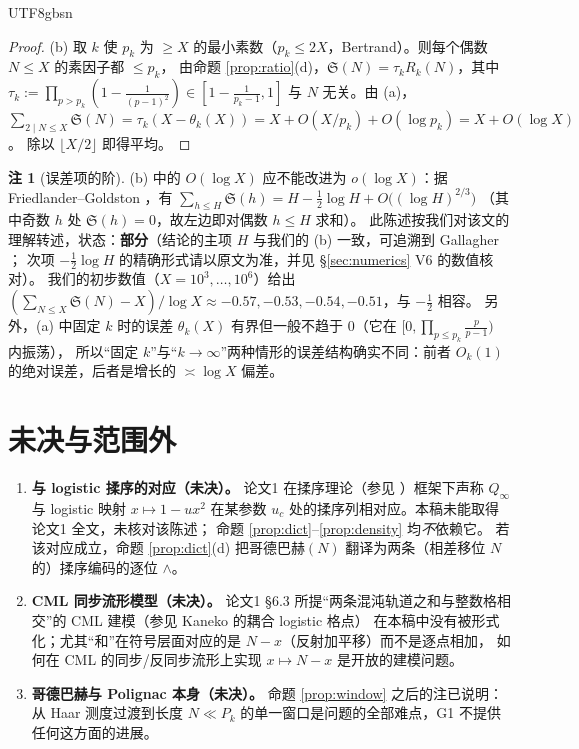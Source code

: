 \documentclass[11pt,a4paper]{article}
\newcommand{\Sing}{\mathfrak S}
\theoremstyle{plain}
\theoremstyle{definition}
\newtheorem{rem}[prop]{注}
\begin{document}
\begin{CJK}{UTF8}{gbsn}
\begin{proof}
(b) 取 $k$ 使 $p_k$ 为 $\ge X$ 的最小素数（$p_k\le2X$，Bertrand）。则每个偶数 $N\le X$ 的素因子都 $\le p_k$，
由命题 \ref{prop:ratio}(d)，$\Sing(N)=\tau_k R_k(N)$，其中 $\tau_k:=\prod_{p>p_k}(1-\frac1{(p-1)^2})\in[1-\frac1{p_k-1},1]$
与 $N$ 无关。由 (a)，
$\sum_{2\mid N\le X}\Sing(N)=\tau_k(X-\theta_k(X))=X+O(X/p_k)+O(\log p_k)=X+O(\log X)$。
除以 $\lfloor X/2\rfloor$ 即得平均。
\end{proof}

\begin{rem}[误差项的阶]\label{rem:FG}
(b) 中的 $O(\log X)$ 应不能改进为 $o(\log X)$：据 Friedlander--Goldston \cite{FG95}，有
$\sum_{h\le H}\Sing(h)=H-\tfrac12\log H+O\bigl((\log H)^{2/3}\bigr)$
（其中奇数 $h$ 处 $\Sing(h)=0$，故左边即对偶数 $h\le H$ 求和）。
此陈述按我们对该文的理解转述，状态：\textbf{部分}（结论的主项 $H$ 与我们的 (b) 一致，可追溯到 Gallagher \cite{Gal76}；
次项 $-\frac12\log H$ 的精确形式请以原文为准，并见 \S\ref{sec:numerics} V6 的数值核对）。
我们的初步数值（$X=10^3,\dots,10^6$）给出 $(\sum_{N\le X}\Sing(N)-X)/\log X\approx-0.57,-0.53,-0.54,-0.51$，与 $-\frac12$ 相容。
另外，(a) 中固定 $k$ 时的误差 $\theta_k(X)$ 有界但一般不趋于 $0$（它在 $[0,\prod_{p\le p_k}\frac p{p-1})$ 内振荡），
所以“固定 $k$”与“$k\to\infty$”两种情形的误差结构确实不同：前者 $O_k(1)$ 的绝对误差，后者是增长的 $\asymp\log X$ 偏差。
\end{rem}

\section{未决与范围外}\label{sec:open}

\begin{enumerate}[leftmargin=*]
\item \textbf{与 logistic 揉序的对应（未决）。} 论文1 \cite{Wang26} 在揉序理论（参见 \cite{MSS73}）框架下声称 $Q_\infty$ 与 logistic 映射
$x\mapsto1-ux^2$ 在某参数 $u_c$ 处的揉序列相对应。本稿未能取得论文1 全文，未核对该陈述；
命题 \ref{prop:dict}--\ref{prop:density} 均\emph{不}依赖它。
若该对应成立，命题 \ref{prop:dict}(d) 把哥德巴赫$(N)$ 翻译为两条（相差移位 $N$ 的）揉序编码的逐位 $\wedge$。
\item \textbf{CML 同步流形模型（未决）。} 论文1 \S6.3 所提“两条混沌轨道之和与整数格相交”的 CML 建模（参见 Kaneko \cite{Kan84} 的耦合 logistic 格点）
在本稿中没有被形式化；尤其“和”在符号层面对应的是 $N-x$（反射加平移）而不是逐点相加，
如何在 CML 的同步/反同步流形上实现 $x\mapsto N-x$ 是开放的建模问题。
\item \textbf{哥德巴赫与 Polignac 本身（未决）。} 命题 \ref{prop:window} 之后的注已说明：
从 Haar 测度过渡到长度 $N\ll P_k$ 的单一窗口是问题的全部难点，G1 不提供任何这方面的进展。
\end{enumerate}


\end{CJK}
\end{document}
